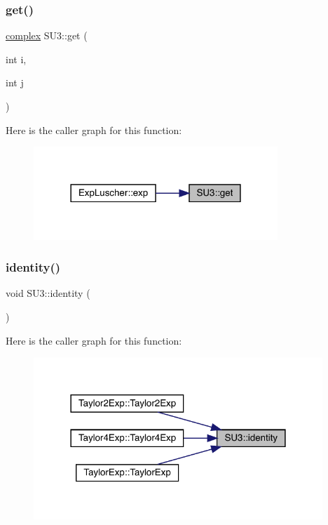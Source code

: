 \mbox{\label{class_s_u3_aa0c34df7c067dcbb917d18cf587046a2}} 
\subsubsection{\texorpdfstring{get()}{get()}}
{\footnotesize\ttfamily \mbox{\hyperlink{classcomplex}{complex}} S\+U3\+::get (\begin{DoxyParamCaption}\item[{int}]{i,  }\item[{int}]{j }\end{DoxyParamCaption})\hspace{0.3cm}{\ttfamily [inline]}}

Here is the caller graph for this function\+:\nopagebreak
\begin{figure}[H]
\begin{center}
\leavevmode
\includegraphics[width=261pt]{class_s_u3_aa0c34df7c067dcbb917d18cf587046a2_icgraph}
\end{center}
\end{figure}
\mbox{\label{class_s_u3_af84aef1d34a4fdcda292200804eb1221}} 
\subsubsection{\texorpdfstring{identity()}{identity()}}
{\footnotesize\ttfamily void S\+U3\+::identity (\begin{DoxyParamCaption}{ }\end{DoxyParamCaption})}

Here is the caller graph for this function\+:\nopagebreak
\begin{figure}[H]
\begin{center}
\leavevmode
\includegraphics[width=309pt]{class_s_u3_af84aef1d34a4fdcda292200804eb1221_icgraph}
\end{center}
\end{figure}
\mbox{\label{class_s_u3_ad0e19706d3c6fdb50dcf788d4b48eb4c}} 
